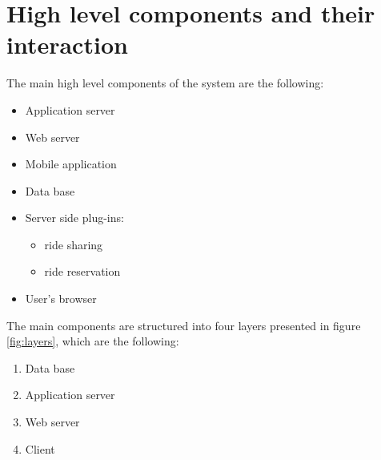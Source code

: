 \section{High level components and their interaction}
\label{sec:high-level}

The main high level components of the system are the following:
\begin{itemize}
	\item Application server
	\item Web server
	\item Mobile application
	\item Data base
	\item Server side plug-ins:
		\begin{itemize}
		\item ride sharing
		\item ride reservation
		\end{itemize}
	\item User's browser
\end{itemize}

The main components are structured into four layers presented in figure \ref{fig:layers}, which are the following:
\begin {enumerate}
	\item Data base
	\item Application server
	\item Web server
	\item Client
\end{enumerate}

